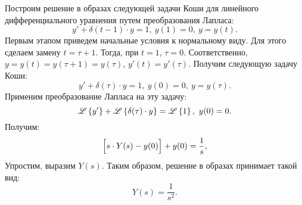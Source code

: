 		\vspace{20pt}

		Построим решение в образах следующей задачи Коши для линейного дифференциального уравнения путем преобразования Лапласа:
		\[ y' + \delta(t-1) \cdot y = 1, ~ y(1) = 0, ~ y = y(t). \]
		Первым этапом приведем начальные условия к нормальному виду. Для этого сделаем замену $t = \tau + 1$. Тогда, при $t = 1$, $\tau = 0$. Соответственно, $y = y(t) = y(\tau+1) = y(\tau)$, $y'(t) = y'(\tau)$. Получим следующую задачу Коши:
		\[ y' + \delta(\tau) \cdot y = 1, ~ y(0) = 0, ~ y = y(\tau). \]
		Применим преобразование Лапласа на эту задачу:
		\[ \mathscr{L} \left\lbrace {y'} \right\rbrace + \mathscr{L} \left\lbrace {\delta(\tau) \cdot y} \right\rbrace = \mathscr{L} \left\lbrace {1} \right\rbrace, ~ y(0) = 0. \]
		Получим:
		\[ \Bigl[ s \cdot Y(s) - y(0) \Bigr] + y(0) = \frac{1}{s}, \]
		Упростим, выразим $Y(s)$. Таким образом, решение в образах принимает такой вид:
		\[ Y(s) = \frac{1}{s^2}. \]
	

